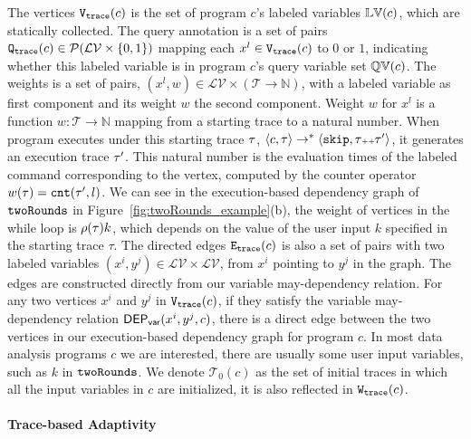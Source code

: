 The vertices $\mathtt{{V_{trace}}}(c)$ is the set of program $c$'s labeled variables $\mathbb{LV}(c)$,
which are statically collected.
The query annotation is 
a set of pairs $\mathtt{{Q_{trace}}}(c) \in \mathcal{P}(\mathcal{LV} \times \{0, 1\} )$ 
mapping each $x^l \in \mathtt{{V_{trace}}}(c)$ to $0$ or $1$, 
indicating whether this labeled variable is in program $c$'s query variable set $\mathbb{QV}(c)$.
{
The weights is a set of pairs, $(x^l, w) \in \mathcal{LV} \times (\mathcal{T} \to \mathbb{N})$,
with a labeled variable as first component and
its weight $w$ the second component.
Weight $w$ for
$x^l$ is a function $w : \mathcal{T} \to \mathbb{N}$
mapping from a starting trace to a natural number.
When program executes under this starting trace $\mathtt{\tau}$,
$\langle {c}, \mathtt{\tau} \rangle \to^{*} \langle \mathtt{skip}, \mathtt{\tau}{\scriptscriptstyle ++}\mathtt{\tau}' \rangle $, it generates an execution trace $\mathtt{\tau}'$.
This natural number is the evaluation times of the labeled command corresponding to the vertex, 
computed by the counter operator $w(\mathtt{\tau}) = \mathtt{cnt}(\mathtt{\tau}', l)$.
We can see in the execution-based dependency graph of $\mathtt{twoRounds}$ in 
Figure~\ref{fig:twoRounds_example}(b), the weight of vertices in the while loop is  $\rho(\mathtt{\tau}) k$, which depends on the value of the user input $k$ specified in the starting trace $\tau$.
The directed edges $\mathtt{{E_{trace}}}({c})$ is also a set of pairs with two labeled variables $ (x^i, y^j) \in \mathcal{LV} \times \mathcal{LV}$, from $x^i$ pointing to $y^j$ in the graph.
The edges are constructed directly from our variable may-dependency relation. 
For any two vertices $x^{i}$ and $y^{j}$ in $\mathtt{{V_{trace}}}(c)$, if they satisfy the variable may-dependency relation $\mathsf{DEP_{var}}(x^i, y^j, c)$, there is a direct edge between the two vertices in our execution-based dependency graph for program $c$.
} 
In most data analysis programs $c$ we are interested, there are usually some user input variables, such as $k$ in $\mathtt{twoRounds}$. 
We denote $\mathcal{T}_0(c)$ as the set of initial traces in which all the input variables in $c$ are initialized, it is also reflected in $\mathtt{{W_{trace}}}({c})$.    

\paragraph{Trace-based Adaptivity}


